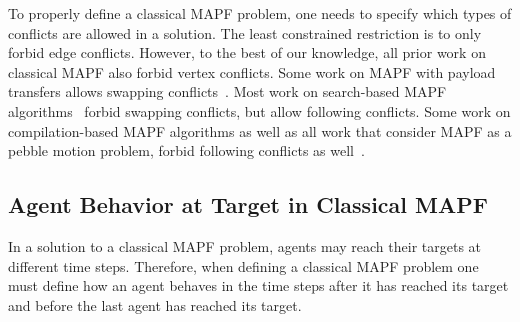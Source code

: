 \documentclass[letterpaper]{article} %
\newcommand{\comment}[1]{{\nb{\textbf{Comment:}}{orange}{#1}}}
\begin{document}
To properly define a classical MAPF problem, one needs to specify which types of conflicts are allowed in a solution.
The least constrained restriction is to only forbid edge conflicts.
However, to the best of our knowledge,
all prior work on classical MAPF also forbid vertex conflicts. Some work on MAPF with payload transfers allows swapping conflicts~\cite{MaAAAI16}.
Most work on search-based MAPF algorithms~\cite{standley2010finding,felner2017search} forbid swapping conflicts, but allow following conflicts.
Some work on compilation-based MAPF algorithms
as well as all work that consider MAPF as a pebble motion problem, forbid following conflicts as well~\cite{surynek2016empirical,bartak2017modeling}.



\subsection{Agent Behavior at Target in Classical MAPF}

In a solution to a classical MAPF problem,
agents may reach their targets at different time steps.
Therefore, when defining a classical MAPF problem one must define
how an agent behaves in the time steps after it has reached its target and before the last agent has reached its target.
\end{document}

